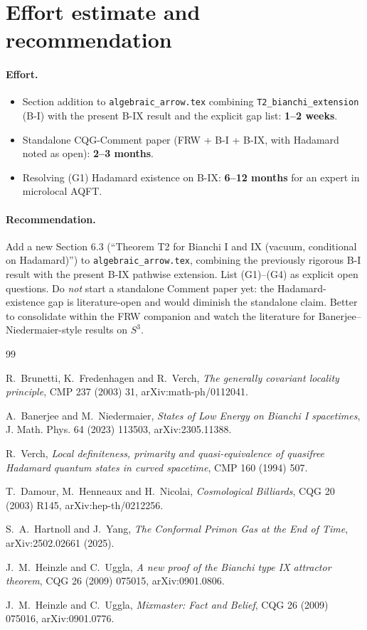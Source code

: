 \documentclass[11pt,a4paper]{article}
\theoremstyle{definition}
\begin{document}
\section{Effort estimate and recommendation}

\paragraph{Effort.}
\begin{itemize}
\item Section addition to \texttt{algebraic\_arrow.tex} combining
  \texttt{T2\_bianchi\_extension} (B-I) with the present B-IX result and
  the explicit gap list: \textbf{1--2 weeks}.
\item Standalone CQG-Comment paper (FRW + B-I + B-IX, with Hadamard
  noted as open): \textbf{2--3 months}.
\item Resolving (G1) Hadamard existence on B-IX: \textbf{6--12 months}
  for an expert in microlocal AQFT.
\end{itemize}

\paragraph{Recommendation.} Add a new Section 6.3 (``Theorem T2 for
Bianchi I and IX (vacuum, conditional on Hadamard)'') to
\texttt{algebraic\_arrow.tex}, combining the previously rigorous B-I
result with the present B-IX pathwise extension. List (G1)--(G4) as
explicit open questions. Do \emph{not} start a standalone Comment paper
yet: the Hadamard-existence gap is literature-open and would diminish
the standalone claim. Better to consolidate within the FRW companion and
watch the literature for Banerjee--Niedermaier-style results on
$S^3$.

\begin{thebibliography}{99}

R.~Brunetti, K.~Fredenhagen and R.~Verch,
\emph{The generally covariant locality principle},
CMP 237 (2003) 31, arXiv:math-ph/0112041.

A.~Banerjee and M.~Niedermaier,
\emph{States of Low Energy on Bianchi I spacetimes},
J. Math. Phys. 64 (2023) 113503, arXiv:2305.11388.

R.~Verch,
\emph{Local definiteness, primarity and quasi-equivalence of quasifree
Hadamard quantum states in curved spacetime},
CMP 160 (1994) 507.

T.~Damour, M.~Henneaux and H.~Nicolai,
\emph{Cosmological Billiards},
CQG 20 (2003) R145, arXiv:hep-th/0212256.

S.~A.~Hartnoll and J.~Yang,
\emph{The Conformal Primon Gas at the End of Time},
arXiv:2502.02661 (2025).

J.~M.~Heinzle and C.~Uggla,
\emph{A new proof of the Bianchi type IX attractor theorem},
CQG 26 (2009) 075015, arXiv:0901.0806.

J.~M.~Heinzle and C.~Uggla,
\emph{Mixmaster: Fact and Belief},
CQG 26 (2009) 075016, arXiv:0901.0776.

\end{thebibliography}
\end{document}
